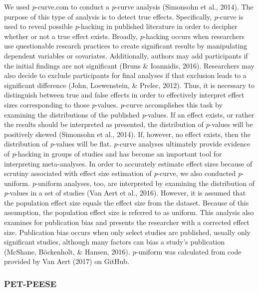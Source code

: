 \documentclass[man]{apa6}
\newcounter{author}
\theoremstyle{definition}
\theoremstyle{definition}
\theoremstyle{definition}
\theoremstyle{remark}
\begin{document}
We used \emph{p}-curve.com to conduct a \emph{p}-curve analysis
(Simonsohn et al., 2014). The purpose of this type of analysis is to
detect true effects. Specifically, \emph{p}-curve is used to reveal
possible \emph{p}-hacking in published literature in order to decipher
whether or not a true effect exists. Broadly, \emph{p}-hacking occurs
when researchers use questionable research practices to create
significant results by manipulating dependent variables or covariates.
Additionally, authors may add participants if the initial findings are
not significant (Bruns \& Ioannidis, 2016). Researchers may also decide
to exclude participants for final analyses if that exclusion leads to a
significant difference (John, Loewenstein, \& Prelec, 2012). Thus, it is
necessary to distinguish between true and false effects in order to
effectively interpret effect sizes corresponding to those
\emph{p}-values. \emph{p}-curve accomplishes this task by examining the
distributions of the published \emph{p}-values. If an effect exists, or
rather the results should be interpreted as presented, the distribution
of \emph{p}-values will be positively skewed (Simonsohn et al., 2014).
If, however, no effect exists, then the distribution of \emph{p}-values
will be flat. \emph{p}-curve analyses ultimately provide evidence of
\emph{p}-hacking in groups of studies and has become an important tool
for interpreting meta-analyses. In order to accurately estimate effect
sizes because of scrutiny associated with effect size estimation of
\emph{p}-curve, we also conducted \emph{p}-uniform. \emph{p}-uniform
analyses, too, are interpreted by examining the distribution of
\emph{p}-values in a set of studies (Van Aert et al., 2016). However, it
is assumed that the population effect size equals the effect size from
the dataset. Because of this assumption, the population effect size is
referred to as uniform. This analysis also examines for publication bias
and presents the researcher with a corrected effect size. Publication
bias occurs when only select studies are published, usually only
significant studies, although many factors can bias a study's
publication (McShane, Böckenholt, \& Hansen, 2016). \emph{p}-uniform was
calculated from code provided by Van Aert (2017) on GitHub.

\subsubsection{PET-PEESE}\label{pet-peese}
\end{document}
